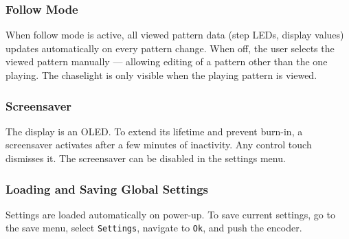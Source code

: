 \subsubsection{Follow Mode}\label{follow-mode}

When follow mode is active, all viewed pattern data (step LEDs, display
values) updates automatically on every pattern change. When off, the
user selects the viewed pattern manually --- allowing editing of a
pattern other than the one playing. The chaselight is only visible when
the playing pattern is viewed.

\subsubsection{Screensaver}\label{screensaver}

The display is an OLED. To extend its lifetime and prevent burn-in, a
screensaver activates after a few minutes of inactivity. Any control
touch dismisses it. The screensaver can be disabled in the settings
menu.

\subsubsection{Loading and Saving Global
Settings}\label{loading-and-saving-global-settings}

Settings are loaded automatically on power-up. To save current settings,
go to the save menu, select \texttt{Settings}, navigate to \texttt{Ok},
and push the encoder.
